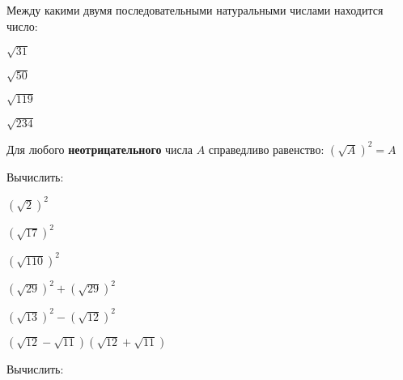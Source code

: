 \begin{class}[number=1]
\begin{listofex}[resume]
		\item Между какими двумя последовательными натуральными числами находится число:
		\begin{enumcols}[itemcolumns=4]
			\item \( \sqrt{31} \)
			\item \( \sqrt{50} \)
			\item \( \sqrt{119} \)
			\item \( \sqrt{234} \)
		\end{enumcols}
	\end{listofex}
	\begin{definit}
		Для любого \textbf{неотрицательного} числа \( A \) справедливо равенство: \( \left( \sqrt{A} \right)^2=A \)
	\end{definit}
	\begin{listofex}[resume]
		\item Вычислить:
		\begin{enumcols}[itemcolumns=3]
			\item \( (\sqrt{2})^2 \)
			\item \( (\sqrt{17})^2 \)
			\item \( (\sqrt{110})^2 \)
			\item \( (\sqrt{29})^2+(\sqrt{29})^2 \)
			\item \( (\sqrt{13})^2-(\sqrt{12})^2 \)
			\item \( (\sqrt{12}-\sqrt{11})(\sqrt{12}+\sqrt{11}) \)
		\end{enumcols}
		\item Вычислить:
		\begin{enumcols}[itemcolumns=3]

\end{enumcols}
\end{listofex}
\end{class}
